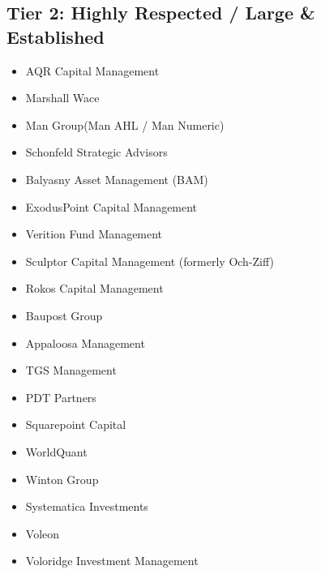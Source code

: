 \documentclass[11pt,a4paper]{article}
\begin{document}
\subsection*{Tier 2: Highly Respected / Large \& Established}
\begin{multicols}{3}
\begin{itemize}[label=\textbullet, leftmargin=*, itemsep=1pt, parsep=0pt]
    \item AQR Capital Management
    \item Marshall Wace
    \item Man Group(Man AHL / Man Numeric)
    \item Schonfeld Strategic Advisors
    \item Balyasny Asset Management (BAM)
    \item ExodusPoint Capital Management
    \item Verition Fund Management
    \item Sculptor Capital Management (formerly Och-Ziff)
    \item Rokos Capital Management
    \item Baupost Group
    \item Appaloosa Management
    \item TGS Management
    \item PDT Partners
    \item Squarepoint Capital
    \item WorldQuant
    \item Winton Group
    \item Systematica Investments
    \item Voleon
    \item Voloridge Investment Management
\end{itemize}
\end{multicols}
\end{document}
